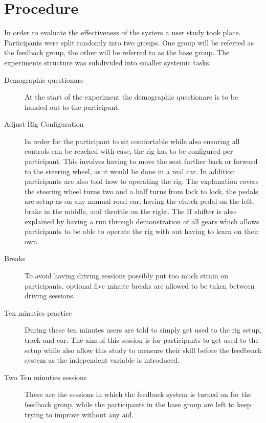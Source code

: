 \section{Procedure}
\label{sec:meth-experiment-structure}
In order to evaluate the effectiveness of the system a user study took place. Participants were split randomly into two groups. One group will be referred as the feedback group, the other will be referred to as the base group. The experiments structure was subdivided into smaller systemic tasks.

\begin{description}
	\item[Demographic questionare] At the start of the experiment the demographic questionare is to be handed out to the participant.
	
	\item[Adjust Rig Configuration] In order for the participant to sit comfortable while also ensuring all controls can be reached with ease, the rig has to be configured per participant. This involves having to move the seat further back or forward to the steering wheel, as it would be done in a real car. In addition participants are also told how to operating the rig. The explanation covers the steering wheel turns two and a half turns from lock to lock, the pedals are setup as on any manual road car, having the clutch pedal on the left, brake in the middle, and throttle on the right. The H shifter is also explained by having a run through demonstration of all gears which allows participants to be able to operate the rig with out having to learn on their own.
	
	\item[Breaks] To avoid having driving sessions possibly put too much strain on participants, optional five minute breaks are allowed to be taken between driving sessions. 
	
	\item[Ten minuties practice] During these ten minutes users are told to simply get used to the rig setup, track and car. The aim of this session is for participants to get used to the setup while also allow this study to measure their skill before the feedbvack system as the independent variable is introduced.
	
	\item[Two Ten minuties sessions] These are the sessions in which the feedback system is turned on for the feedback group, while the participants in the base group are left to keep trying to improve without any aid. 
	

\end{description}
